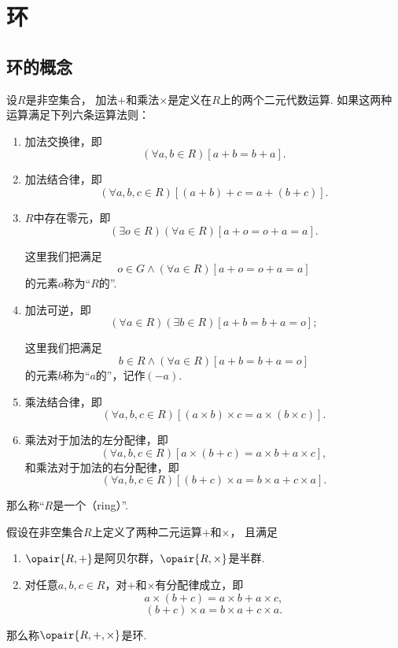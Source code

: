 \section{环}
\subsection{环的概念}
\begin{definition}
设\(R\)是非空集合，
加法\(+\)和乘法\(\times\)是定义在\(R\)上的两个二元代数运算.
如果这两种运算满足下列六条运算法则：
\begin{enumerate}
    \item 加法交换律，即\[
        (\forall a,b \in R)[a+b = b+a].
    \]

    \item 加法结合律，即\[
        (\forall a,b,c \in R)[(a+b)+c = a+(b+c)].
    \]

    \item \(R\)中存在零元，即\[
        (\exists o \in R)(\forall a \in R)[a+o = o+a = a].
    \]

	这里我们把满足\[
		o \in G
		\land
		(\forall a \in R)[a+o = o+a = a]
	\]的元素\(o\)称为“\(R\)的”.

    \item 加法可逆，即\[
        (\forall a \in R)(\exists b \in R)[a+b = b+a = o];
    \]

	这里我们把满足\[
		b \in R
		\land
        (\forall a \in R)[a+b = b+a = o]
	\]的元素\(b\)称为“\(a\)的”，记作\((-a)\).

    \item 乘法结合律，即\[
        (\forall a,b,c \in R)
        [ (a \times b) \times c = a \times (b \times c) ].
    \]

    \item 乘法对于加法的左分配律，即\[
        (\forall a,b,c \in R)[ a \times (b+c) = a \times b + a \times c ],
    \]
    和乘法对于加法的右分配律，即\[
        (\forall a,b,c \in R)[ (b+c) \times a = b \times a + c \times a ].
    \]
\end{enumerate}
那么称“\(R\)是一个（ring）”.
\end{definition}

\begin{theorem}
假设在非空集合\(R\)上定义了两种二元运算\(+\)和\(\times\)，
且满足\begin{enumerate}
    \item \(\opair{R,+}\)是阿贝尔群，\(\opair{R,\times}\)是半群.

    \item 对任意\(a,b,c \in R\)，对\(+\)和\(\times\)有分配律成立，即\[
        a \times (b + c) = a \times b + a \times c,
    \]\[
        (b + c) \times a = b \times a + c \times a.
    \]
\end{enumerate}
那么称\(\opair{R,+,\times}\)是环.
\end{theorem}

